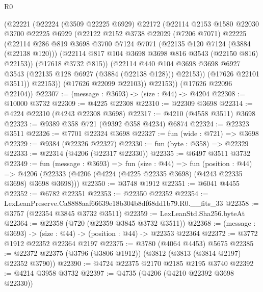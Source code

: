 \begin{lexlean}{R0}
\begin{coremodule}
              (@22221
                (@22224
                  (@3509 @22225 @6929)
                  @22172
                  (@22114
                    @2153
                    @1580
                    @22030
                    @3700
                    @22225
                    @6929
                    (@22122
                      @2152
                      @3738
                      @22029
                      (@7206 @7071)
                      @22225
                      (@22114
                        @286
                        @819
                        @3698
                        @3700
                        @7124
                        @7071
                        (@22135 @120 @7124 (@3884 (@22138 @120)))
                        (@22114 @817 @104 @3698 @3698 @816 @3543 (@22150 @816) @22153))
                      (@17618 @3732 @815))
                    (@22114
                      @440
                      @104
                      @3698
                      @3698
                      @6927
                      @3543
                      (@22135 @128 @6927 (@3884 (@22138 @128)))
                      @22153))
                  (@17626 @22101 @3511))
                @22153))
            (@17626 @22099 @22103))
          @22153))
      (@17626 @22096 @22104))
@22307 := (message : @3693) -> (size : @44) -> @4204
@22308 := @10000 @3732
@22309 := @4225 @22308
@22310 := @22309 @3698
@22314 := @4224 @22310 (@4243 @22308 @3698)
@22317 := @4210 (@4558 @3511) @3698
@22323 := @9389 @358 @721 (@9392 @358 @4234) @6874
@22324 := @22323 @3511
@22326 := @7701 @22324 @3698
@22327 := fun (wide : @721) => @3698
@22329 := @9384 (@22326 @22327)
@22330 := fun (byte : @358) => @22329
@22333 := @22314 (@4206 (@22317 @22330))
@22335 := @6497 @3511 @3732
@22349 := fun (message : @3693) =>
  fun (size : @44) =>
  fun (position : @44) =>
  @4206 (@22333 (@4206 (@4224 (@4225 @22335 @3698) (@4243 @22335 @3698) @3698 @3698)))
@22350 := @3748 @1912
@22351 := @6041 @4455
@22352 := @6782 @22351
@22353 := @22350 @22352
@22354 := LexLeanPreserve.Ca8888aaf66639e18b304b8df68dd1b79.R0.__fits_33
@22358 := @3757 (@22354 @3845 @3732 @3511)
@22359 := LexLeanStd.Sha256.byteAt
@22364 := @22358 (@720 (@22359 @3845 @3732 @3511))
@22368 := (message : @3693) -> (size : @44) -> (position : @44) -> @22353 @22364
@22372 := @3772 @1912 @22352 @22364 @2197
@22375 := @3780 (@4064 @4453) @5675
@22385 := @22372 @22375 (@3796 (@3806 @1912)) (@3812 (@3813 (@3814 @2197) @22352 @3790))
@22390 := @4724 @22375 @2170 @2185 @2195 @3740
@22392 := @4214 @3958 @3732
@22397 := @4735 (@4206 (@4210 @22392 @3698 @22330))

\end{coremodule}
\end{lexlean}
